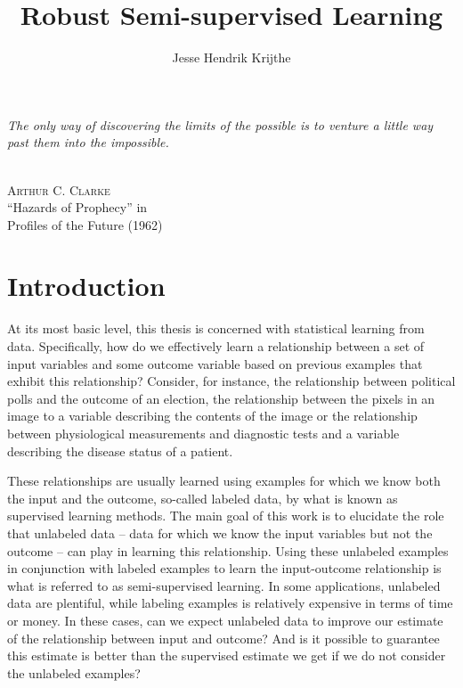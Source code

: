 \documentclass[twoside]{memoir}\usepackage[]{graphicx}\usepackage{xcolor}
\title{Robust Semi-supervised Learning}
\author{Jesse Hendrik Krijthe}
\begin{document}
%
\cleartorecto
\setcounter{page}{1}

\frontmatter*

\thispagestyle{empty}
\vspace*{5cm}
\epigraphfontsize{\Large}
\setlength{\epigraphwidth}{0.8\textwidth}
\setlength{\epigraphrule}{0pt}
\epigraph{\textit{The only way of discovering the limits of the possible is to venture a little way past them into the impossible.}}{\textsc{\\Arthur C. Clarke}\vspace{0.2cm}\\\footnotesize{``Hazards of Prophecy'' in \\Profiles of the Future (1962)}} \nocite{Clarke1962}
\cleardoublepage

\tableofcontents*





\chapter[Introduction]{Introduction}
At its most basic level, this thesis is concerned with statistical learning from data. Specifically, how do we effectively learn a relationship between a set of input variables and some outcome variable based on previous examples that exhibit this relationship? Consider, for instance, the relationship between political polls and the outcome of an election, the relationship between the pixels in an image to a variable describing the contents of the image or the relationship between physiological measurements and diagnostic tests and a variable describing the disease status of a patient.

These relationships are usually learned using examples for which we know both the input and the outcome, so-called labeled data, by what is known as supervised learning methods. The main goal of this work is to elucidate the role that unlabeled data -- data for which we know the input variables but not the outcome -- can play in learning this relationship. Using these unlabeled examples in conjunction with labeled examples to learn the input-outcome relationship is what is referred to as semi-supervised learning. In some applications, unlabeled data are plentiful, while labeling examples is relatively expensive in terms of time or money. In these cases, can we expect unlabeled data to improve our estimate of the relationship between input and outcome? And is it possible to guarantee this estimate is better than the supervised estimate we get if we do not consider the unlabeled examples?
\end{document}
